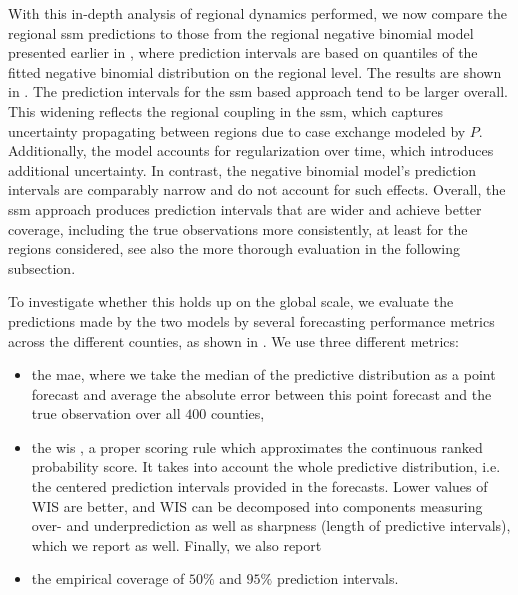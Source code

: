 With this in-depth analysis of regional dynamics performed, we now compare the regional \gls{ssm} predictions to those from the regional negative binomial model presented earlier in , where prediction intervals are based on quantiles of the fitted negative binomial distribution on the regional level. The results are shown in . The prediction intervals for the \gls{ssm} based approach tend to be larger overall. 
This widening reflects the regional coupling in the \gls{ssm}, which captures uncertainty propagating between regions due to case exchange modeled by $P$. Additionally, the model accounts for regularization over time, which introduces additional uncertainty. In contrast, the negative binomial model's prediction intervals are comparably narrow and do not account for such effects. Overall, the \gls{ssm} approach produces prediction intervals that are wider and achieve better coverage, including the true observations more consistently, at least for the regions considered, see also the more thorough evaluation in the following subsection.

\begin{table}
    \centering
    
    \caption{Mean prediction metrics across all $400$ regions for forecasts produced by the regional negative binomial and \gls{ssm} models for 27 June 2020. The \gls{ssm} approach consistently beats the regional baseline, except for the sharpness component of the \gls{wis}.}
    \label{tab:performance_regional_ssm_vs_nbinom}
\end{table}

To investigate whether this holds up on the global scale, we evaluate the predictions made by the two models by several forecasting performance metrics across the different counties, as shown in . We use three different metrics: 
\begin{itemize}
    \item the \acrlong{mae}, where we take the median of the predictive distribution as a point forecast and average the absolute error between this point forecast and the true observation over all $400$ counties,
    \item the \acrlong{wis} \citep{Bracher2021Evaluating}, a proper scoring rule which approximates the continuous ranked probability score. It takes into account the whole predictive distribution, i.e. the centered prediction intervals provided in the forecasts. Lower values of WIS are better, and WIS can be decomposed into components measuring over- and underprediction as well as sharpness (length of predictive intervals), which we report as well. Finally, we also report
    \item the empirical coverage of $50\%$ and $95\%$ prediction intervals. 
\end{itemize}

